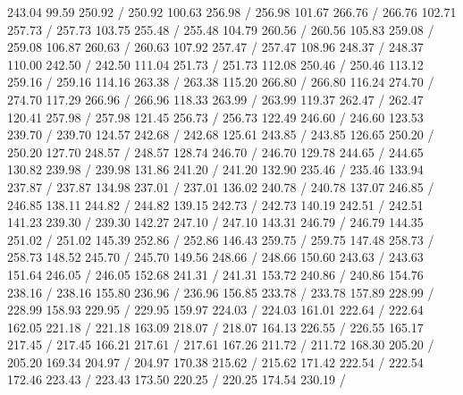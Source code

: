 { 243.04 99.59 250.92 /
 250.92 100.63 256.98 /
 256.98 101.67 266.76 /
 266.76 102.71 257.73 /
 257.73 103.75 255.48 /
 255.48 104.79 260.56 /
 260.56 105.83 259.08 /
 259.08 106.87 260.63 /
 260.63 107.92 257.47 /
 257.47 108.96 248.37 /
 248.37 110.00 242.50 /
 242.50 111.04 251.73 /
 251.73 112.08 250.46 /
 250.46 113.12 259.16 /
 259.16 114.16 263.38 /
 263.38 115.20 266.80 /
 266.80 116.24 274.70 /
 274.70 117.29 266.96 /
 266.96 118.33 263.99 /
 263.99 119.37 262.47 /
 262.47 120.41 257.98 /
 257.98 121.45 256.73 /
 256.73 122.49 246.60 /
 246.60 123.53 239.70 /
 239.70 124.57 242.68 /
 242.68 125.61 243.85 /
 243.85 126.65 250.20 /
 250.20 127.70 248.57 /
 248.57 128.74 246.70 /
 246.70 129.78 244.65 /
 244.65 130.82 239.98 /
 239.98 131.86 241.20 /
 241.20 132.90 235.46 /
 235.46 133.94 237.87 /
 237.87 134.98 237.01 /
 237.01 136.02 240.78 /
 240.78 137.07 246.85 /
 246.85 138.11 244.82 /
 244.82 139.15 242.73 /
 242.73 140.19 242.51 /
 242.51 141.23 239.30 /
 239.30 142.27 247.10 /
 247.10 143.31 246.79 /
 246.79 144.35 251.02 /
 251.02 145.39 252.86 /
 252.86 146.43 259.75 /
 259.75 147.48 258.73 /
 258.73 148.52 245.70 /
 245.70 149.56 248.66 /
 248.66 150.60 243.63 /
 243.63 151.64 246.05 /
 246.05 152.68 241.31 /
 241.31 153.72 240.86 /
 240.86 154.76 238.16 /
 238.16 155.80 236.96 /
 236.96 156.85 233.78 /
 233.78 157.89 228.99 /
 228.99 158.93 229.95 /
 229.95 159.97 224.03 /
 224.03 161.01 222.64 /
 222.64 162.05 221.18 /
 221.18 163.09 218.07 /
 218.07 164.13 226.55 /
 226.55 165.17 217.45 /
 217.45 166.21 217.61 /
 217.61 167.26 211.72 /
 211.72 168.30 205.20 /
 205.20 169.34 204.97 /
 204.97 170.38 215.62 /
 215.62 171.42 222.54 /
 222.54 172.46 223.43 /
 223.43 173.50 220.25 /
 220.25 174.54 230.19 /
}
